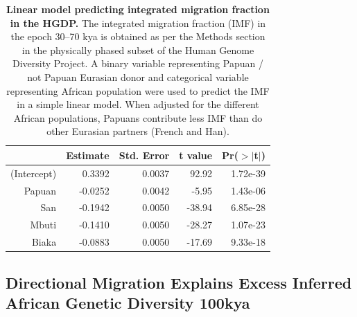   \begin{table}[ht]
  \centering
  \begin{tabular}{rrrrr}
    \hline
   & Estimate & Std. Error & t value & Pr($>$$|$t$|$) \\ 
    \hline
  (Intercept) & 0.3392 & 0.0037 & 92.92 & 1.72e-39 \\ 
    Papuan & -0.0252 & 0.0042 & -5.95 & 1.43e-06 \\ 
    San & -0.1942 & 0.0050 & -38.94 & 6.85e-28 \\ 
    Mbuti & -0.1410 & 0.0050 & -28.27 & 1.07e-23 \\ 
    Biaka & -0.0883 & 0.0050 & -17.69 & 9.33e-18 \\ 
     \hline
  \end{tabular}
  \caption{ {\bf Linear model predicting integrated migration fraction in the HGDP.} The integrated migration fraction (IMF) in the epoch 30--70 kya is obtained as per the Methods section in the physically phased subset of the Human Genome Diversity Project.  A binary variable representing Papuan / not Papuan Eurasian donor and categorical variable representing African population were used to predict the IMF in a simple linear model. When adjusted for the different African populations, Papuans contribute less IMF than do other Eurasian partners (French and Han). } 
  \label{table:hgdp:papuan_imf}
  \end{table}
  

\subsection{Directional Migration Explains Excess Inferred African Genetic Diversity 100kya} 

